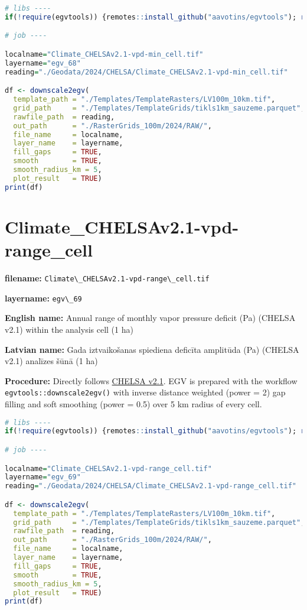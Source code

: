 \documentclass[
]{book}
\newcommand{\passthrough}[1]{#1}
\begin{document}
\begin{lstlisting}[language=R]
# libs ----
if(!require(egvtools)) {remotes::install_github("aavotins/egvtools"); require(egvtools)}

# job ----

localname="Climate_CHELSAv2.1-vpd-min_cell.tif"
layername="egv_68"
reading="./Geodata/2024/CHELSA/Climate_CHELSAv2.1-vpd-min_cell.tif"

df <- downscale2egv(
  template_path = "./Templates/TemplateRasters/LV100m_10km.tif",
  grid_path     = "./Templates/TemplateGrids/tikls1km_sauzeme.parquet",
  rawfile_path  = reading,
  out_path      = "./RasterGrids_100m/2024/RAW/",
  file_name     = localname,
  layer_name    = layername,
  fill_gaps     = TRUE,
  smooth        = TRUE,
  smooth_radius_km = 5,
  plot_result   = TRUE)
print(df)
\end{lstlisting}

\section{Climate\_CHELSAv2.1-vpd-range\_cell}\label{ch06.069}

\textbf{filename:} \passthrough{\lstinline!Climate\_CHELSAv2.1-vpd-range\_cell.tif!}

\textbf{layername:} \passthrough{\lstinline!egv\_69!}

\textbf{English name:} Annual range of monthly vapor pressure deficit (Pa) (CHELSA v2.1) within the analysis cell (1 ha)

\textbf{Latvian name:} Gada iztvaikošanas spiediena deficīta amplitūda (Pa) (CHELSA v2.1) analīzes šūnā (1 ha)

\textbf{Procedure:} Directly follows \hyperref[Ch04.11]{CHELSA v2.1}. EGV is prepared with the
workflow \passthrough{\lstinline!egvtools::downscale2egv()!} with inverse distance weighted (power = 2)
gap filling and soft smoothing (power = 0.5) over 5 km radius of every cell.

\begin{lstlisting}[language=R]
# libs ----
if(!require(egvtools)) {remotes::install_github("aavotins/egvtools"); require(egvtools)}

# job ----

localname="Climate_CHELSAv2.1-vpd-range_cell.tif"
layername="egv_69"
reading="./Geodata/2024/CHELSA/Climate_CHELSAv2.1-vpd-range_cell.tif"

df <- downscale2egv(
  template_path = "./Templates/TemplateRasters/LV100m_10km.tif",
  grid_path     = "./Templates/TemplateGrids/tikls1km_sauzeme.parquet",
  rawfile_path  = reading,
  out_path      = "./RasterGrids_100m/2024/RAW/",
  file_name     = localname,
  layer_name    = layername,
  fill_gaps     = TRUE,
  smooth        = TRUE,
  smooth_radius_km = 5,
  plot_result   = TRUE)
print(df)
\end{lstlisting}
\end{document}

